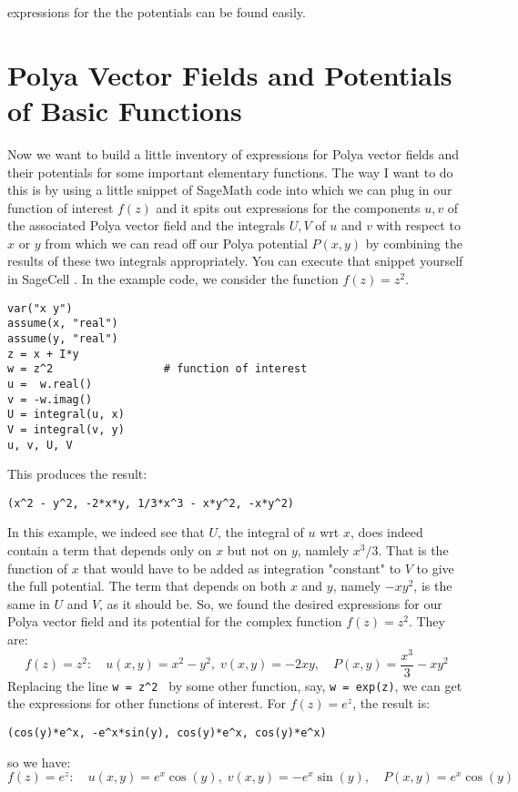 \documentclass[12pt]{article}
\begin{document}
expressions for the the potentials can be found easily.

\section{Polya Vector Fields and Potentials of Basic Functions}
Now we want to build a little inventory of expressions for Polya vector fields and their potentials for some important elementary functions. The way I want to do this is by using a little snippet of SageMath code into which we can plug in our function of interest $f(z)$ and it spits out expressions for the components $u,v$ of the associated Polya vector field and the integrals $U,V$ of $u$ and $v$ with respect to $x$ or $y$ from which we can read off our Polya potential $P(x,y)$ by combining the results of these two integrals appropriately. You can execute that snippet yourself in SageCell \cite{SageCell}. In the example code, we consider the function $f(z) = z^2$.
\begin{verbatim}
var("x y")
assume(x, "real")
assume(y, "real")
z = x + I*y
w = z^2                 # function of interest
u =  w.real() 
v = -w.imag()
U = integral(u, x)
V = integral(v, y)
u, v, U, V	
\end{verbatim}
This produces the result:
\begin{verbatim}
(x^2 - y^2, -2*x*y, 1/3*x^3 - x*y^2, -x*y^2)
\end{verbatim}
In this example, we indeed see that $U$, the integral of $u$ wrt $x$, does indeed contain a term that depends only on $x$ but not on $y$, namlely $x^3/3$. That is the function of $x$ that would have to be added as integration "constant" to $V$ to give the full potential. The term that depends on both $x$ and $y$, namely $-x y^2$, is the same in $U$ and $V$, as it should be. So, we found the desired expressions for our Polya vector field and its potential for the complex function $f(z) = z^2$. They are:
\begin{equation}
f(z) = z^2: \quad 
u(x,y) = x^2 - y^2, \; 
v(x,y) = -2 x y, \quad 
P(x,y) = \frac{x^3}{3} -x y^2
\end{equation}
Replacing the line \texttt{w = z\textasciicircum2 } by some other function, say, \texttt{w = exp(z)}, we can get the expressions for other functions of interest. For $f(z) = e^z$, the result is:
\begin{verbatim}
(cos(y)*e^x, -e^x*sin(y), cos(y)*e^x, cos(y)*e^x)
\end{verbatim}
so we have:
\begin{equation}
f(z) = e^z: \quad 
u(x,y) =  e^x \cos(y), \; 
v(x,y) = -e^x \sin(y), \quad 
P(x,y) =  e^x \cos(y)
\end{equation}
\end{document}
